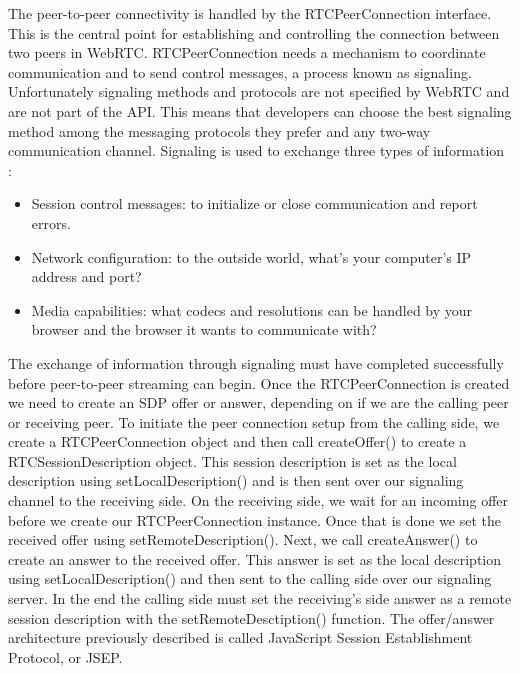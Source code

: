 \documentclass[../main.tex]{subfiles}
\begin{document}
The peer-to-peer connectivity is handled by the RTCPeerConnection interface. This is the central point for establishing and controlling the connection between two peers in WebRTC. RTCPeerConnection needs a mechanism to coordinate communication and to send control messages, a process known as signaling. Unfortunately signaling methods and protocols are not specified by WebRTC and are not part of the API. This means that developers can choose the best signaling method among the messaging protocols they prefer and any two-way communication channel. Signaling is used to exchange three types of information \cite{Get_started_with_WebRTC}:

\begin{itemize}
    \item Session control messages: to initialize or close communication and report errors.
    \item Network configuration: to the outside world, what's your computer's IP address and port?
    \item Media capabilities: what codecs and resolutions can be handled by your browser and the browser it wants to communicate with?
\end{itemize}

The exchange of information through signaling must have completed successfully before peer-to-peer streaming can begin. Once the RTCPeerConnection is created we need to create an SDP offer or answer, depending on if we are the calling peer or receiving peer. To initiate the peer connection setup from the calling side, we create a RTCPeerConnection object and then call createOffer() to create a RTCSessionDescription object. This session description is set as the local description using setLocalDescription() and is then sent over our signaling channel to the receiving side. On the receiving side, we wait for an incoming offer before we create our RTCPeerConnection instance. Once that is done we set the received offer using setRemoteDescription(). Next, we call createAnswer() to create an answer to the received offer. This answer is set as the local description using setLocalDescription() and then sent to the calling side over our signaling server. In the end the calling side must set the receiving's side answer as a remote session description with the setRemoteDesctiption() function. The offer/answer architecture previously described is called JavaScript Session Establishment Protocol, or JSEP. 
\end{document}
